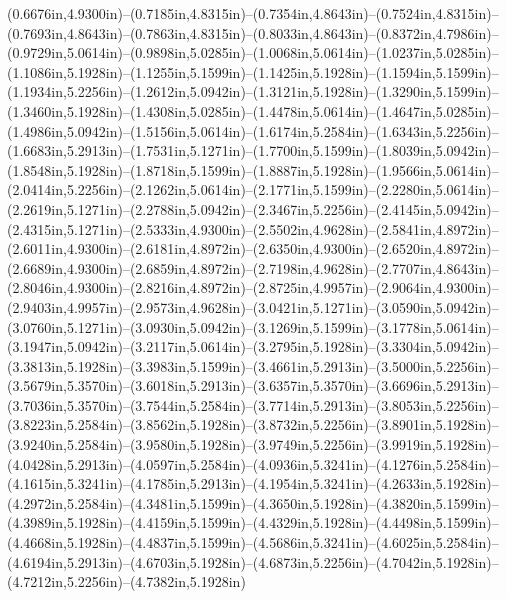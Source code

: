 (0.6676in,4.9300in)--(0.7185in,4.8315in)--(0.7354in,4.8643in)--(0.7524in,4.8315in)--(0.7693in,4.8643in)--(0.7863in,4.8315in)--(0.8033in,4.8643in)--(0.8372in,4.7986in)--(0.9729in,5.0614in)--(0.9898in,5.0285in)--(1.0068in,5.0614in)--(1.0237in,5.0285in)--(1.1086in,5.1928in)--(1.1255in,5.1599in)--(1.1425in,5.1928in)--(1.1594in,5.1599in)--(1.1934in,5.2256in)--(1.2612in,5.0942in)--(1.3121in,5.1928in)--(1.3290in,5.1599in)--(1.3460in,5.1928in)--(1.4308in,5.0285in)--(1.4478in,5.0614in)--(1.4647in,5.0285in)--(1.4986in,5.0942in)--(1.5156in,5.0614in)--(1.6174in,5.2584in)--(1.6343in,5.2256in)--(1.6683in,5.2913in)--(1.7531in,5.1271in)--(1.7700in,5.1599in)--(1.8039in,5.0942in)--(1.8548in,5.1928in)--(1.8718in,5.1599in)--(1.8887in,5.1928in)--(1.9566in,5.0614in)--(2.0414in,5.2256in)--(2.1262in,5.0614in)--(2.1771in,5.1599in)--(2.2280in,5.0614in)--(2.2619in,5.1271in)--(2.2788in,5.0942in)--(2.3467in,5.2256in)--(2.4145in,5.0942in)--(2.4315in,5.1271in)--(2.5333in,4.9300in)--(2.5502in,4.9628in)--(2.5841in,4.8972in)--(2.6011in,4.9300in)--(2.6181in,4.8972in)--(2.6350in,4.9300in)--(2.6520in,4.8972in)--(2.6689in,4.9300in)--(2.6859in,4.8972in)--(2.7198in,4.9628in)--(2.7707in,4.8643in)--(2.8046in,4.9300in)--(2.8216in,4.8972in)--(2.8725in,4.9957in)--(2.9064in,4.9300in)--(2.9403in,4.9957in)--(2.9573in,4.9628in)--(3.0421in,5.1271in)--(3.0590in,5.0942in)--(3.0760in,5.1271in)--(3.0930in,5.0942in)--(3.1269in,5.1599in)--(3.1778in,5.0614in)--(3.1947in,5.0942in)--(3.2117in,5.0614in)--(3.2795in,5.1928in)--(3.3304in,5.0942in)--(3.3813in,5.1928in)--(3.3983in,5.1599in)--(3.4661in,5.2913in)--(3.5000in,5.2256in)--(3.5679in,5.3570in)--(3.6018in,5.2913in)--(3.6357in,5.3570in)--(3.6696in,5.2913in)--(3.7036in,5.3570in)--(3.7544in,5.2584in)--(3.7714in,5.2913in)--(3.8053in,5.2256in)--(3.8223in,5.2584in)--(3.8562in,5.1928in)--(3.8732in,5.2256in)--(3.8901in,5.1928in)--(3.9240in,5.2584in)--(3.9580in,5.1928in)--(3.9749in,5.2256in)--(3.9919in,5.1928in)--(4.0428in,5.2913in)--(4.0597in,5.2584in)--(4.0936in,5.3241in)--(4.1276in,5.2584in)--(4.1615in,5.3241in)--(4.1785in,5.2913in)--(4.1954in,5.3241in)--(4.2633in,5.1928in)--(4.2972in,5.2584in)--(4.3481in,5.1599in)--(4.3650in,5.1928in)--(4.3820in,5.1599in)--(4.3989in,5.1928in)--(4.4159in,5.1599in)--(4.4329in,5.1928in)--(4.4498in,5.1599in)--(4.4668in,5.1928in)--(4.4837in,5.1599in)--(4.5686in,5.3241in)--(4.6025in,5.2584in)--(4.6194in,5.2913in)--(4.6703in,5.1928in)--(4.6873in,5.2256in)--(4.7042in,5.1928in)--(4.7212in,5.2256in)--(4.7382in,5.1928in) 